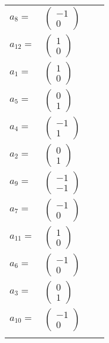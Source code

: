 \documentclass[1p]{elsarticle_modified}
\theoremstyle{definition}
\begin{document}
\begin{tabular}{m{7pt} m{180pt} m{7pt} m{180pt} }
\flushright $a_{8}=$&$\begin{pmatrix}-1\\0\end{pmatrix}$ \\
\flushright $a_{12}=$&$\begin{pmatrix}1\\0\end{pmatrix}$ \\
\flushright $a_{1}=$&$\begin{pmatrix}1\\0\end{pmatrix}$ \\
\flushright $a_{5}=$&$\begin{pmatrix}0\\1\end{pmatrix}$ \\
\flushright $a_{4}=$&$\begin{pmatrix}-1\\1\end{pmatrix}$ \\
\flushright $a_{2}=$&$\begin{pmatrix}0\\1\end{pmatrix}$ \\
\flushright $a_{9}=$&$\begin{pmatrix}-1\\-1\end{pmatrix}$ \\
\flushright $a_{7}=$&$\begin{pmatrix}-1\\0\end{pmatrix}$ \\
\flushright $a_{11}=$&$\begin{pmatrix}1\\0\end{pmatrix}$ \\
\flushright $a_{6}=$&$\begin{pmatrix}-1\\0\end{pmatrix}$ \\
\flushright $a_{3}=$&$\begin{pmatrix}0\\1\end{pmatrix}$ \\
\flushright $a_{10}=$&$\begin{pmatrix}-1\\0\end{pmatrix}$\\&\end{tabular}
\end{document}

